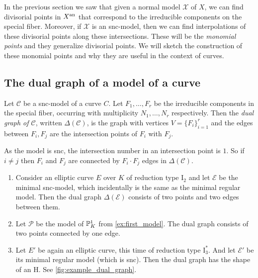 In the previous section we saw that given a normal model $\mathscr X$ of $X$, we can find divisorial points in $X{}^{\text{an}}$ that correspond to the irreducible components on the special fiber.  
Moreover, if $\mathscr X$ is an snc-model, then we can find interpolations of these divisorial points along these intersections. 
These will be the \emph{monomial points} and they generalize divisorial points.  
We will sketch the construction of these monomial points and why they are useful in the context of curves. 

\subsection{The dual graph of a model of a curve} \label{sec:the_dual_graph_of_a_model_of_a_curve}
\begin{definition}
	Let $\mathscr C$ be a snc-model of a curve $C$.
	Let $F_1, \ldots, F_r$ be the irreducible components in the special fiber, occurring with multiplicity $N_1, \ldots, N_r$ respectively. 
	Then the \emph{dual graph of $\mathscr C$}, written $\Delta(\mathscr C)$, is the graph with vertices $V = \{F_i\}_{i = 1}^{r} $ and the edges between $F_i, F_j$ are the intersection points of $F_i$ with $F_j$. 
\end{definition}
As the model is snc, the intersection number in an intersection point is  $1$. 
So if $i \ne j$ then $F_i$ and $F_j$ are connected by $F_i \cdot F_j$ edges in $\Delta(\mathscr C)$. 
\begin{example}\label{ex:first_dual_graph}
	\begin{enumerate}
		\item Consider an elliptic curve $E$ over $K$ of reduction type $\mathrm I_2$ and let $\mathscr E$ be the minimal snc-model, which incidentally is the same as the minimal regular model. 
			Then the dual graph $\Delta(\mathscr E)$ consists of two points and two edges between them.
		\item Let $\mathscr P$ be the model of $\mathbb{P}_K^{1}$ from \cref{ex:first_model}. 
			The dual graph consists of two points connected by one edge.  
		\item Let $E'$ be again an elliptic curve, this time of reduction type $\mathrm I_3^*$. 
			And let $\mathscr E'$ be its minimal regular model (which is snc). 
			Then the dual graph has the shape of an H. See \cref{fig:example_dual_graph}.

	\end{enumerate}
\end{example}

